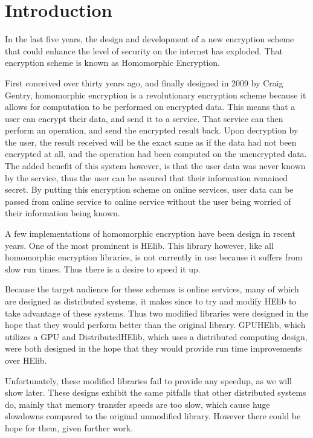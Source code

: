 \chapter{Introduction} \label{chap:Introduction}
In the last five years, the design and development of a new encryption scheme that could enhance the level of security on the internet has exploded. That encryption scheme is known as Homomorphic Encryption. 

First conceived over thirty years ago, and finally designed in 2009 by Craig Gentry, homomorphic encryption is a revolutionary encryption scheme because it allows for computation to be performed on encrypted data. This means that a user can encrypt their data, and send it to a service. That service can then perform an operation, and send the encrypted result back. Upon decryption by the user, the result received will be the exact same as if the data had not been encrypted at all, and the operation had been computed on the unencrypted data. The added benefit of this system however, is that the user data was never known by the service, thus the user can be assured that their information remained secret. By putting this encryption scheme on online services, user data can be passed from online service to online service without the user being worried of their information being known.

A few implementations of homomorphic encryption have been design in recent years. One of the most prominent is HElib. This library however, like all homomorphic encryption libraries, is not currently in use because it suffers from slow run times. Thus there is a desire to speed it up. 

Because the target audience for these schemes is online services, many of which are designed as distributed systems, it makes since to try and modify HElib to take advantage of these systems. Thus two modified libraries were designed in the hope that they would perform better than the original library. GPUHElib, which utilizes a GPU and DistributedHElib, which uses a distributed computing design, were both designed in the hope that they would provide run time improvements over HElib. 

Unfortunately, these modified libraries fail to provide any speedup, as we will show later. These designs exhibit the same pitfalls that other distributed systems do, mainly that memory transfer speeds are too slow, which cause huge slowdowns compared to the original unmodified library. However there could be hope for them, given further work.